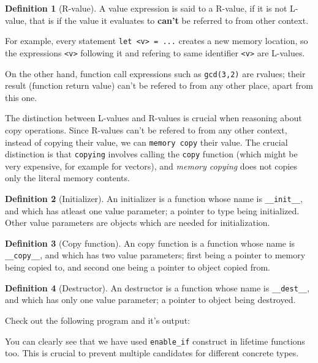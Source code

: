 \documentclass[times, utf8, diplomski]{fer}
\theoremstyle{definition}
\newtheorem{definition}{Definition}[]
\newcommand{\textcode}[3]{
    
}
\begin{document}
\begin{definition}[R-value]
A value expression is said to a R-value, if it is not L-value, that is
if the value it evaluates to \textbf{can't} be referred to from other context.
\end{definition}

For example, every statement \texttt{let <v> = ...} creates a new memory location,
so the expressions \texttt{<v>} following it and refering to same identifier \texttt{<v>} are L-values.

On the other hand, function call expressions such as \texttt{gcd(3,2)} are rvalues; their result
(function return value) can't be refered to from any other place, apart from this one.

The distinction between L-values and R-values is crucial when reasoning about copy operations.
Since R-values can't be refered to from any other context, instead of copying their value, 
we can \texttt{memory copy} their value. The crucial distinction is that \texttt{copying}
involves calling the \texttt{copy} function (which might be very expensive, for example for vectors),
and \textit{memory copying} does not copies only the literal memory contents.

\begin{definition}[Initializer]
An initializer is a function whose name is \texttt{__init__}, and which has atleast one value parameter;
a pointer to type being initialized. Other value parameters are objects which are needed for initialization.
\end{definition}

\begin{definition}[Copy function]
An copy function is a function whose name is \texttt{__copy__}, and which has two value parameters;
first being a pointer to memory being copied to, and second one being a pointer to object copied from.
\end{definition}

\begin{definition}[Destructor]
An destructor is a function whose name is \texttt{__dest__}, and which has only one value parameter;
a pointer to object being destroyed.
\end{definition}

Check out the following program and it's output:

\textcode{\resdir/compiler/lifetime_ex.agt}{}{a}
\textcode{\resdir/compiler/lifetime_ex.out}{}{a}

You can clearly see that we have used \texttt{enable\_if} construct in lifetime functions too.
This is crucial to prevent multiple candidates for different concrete types.
\end{document}
